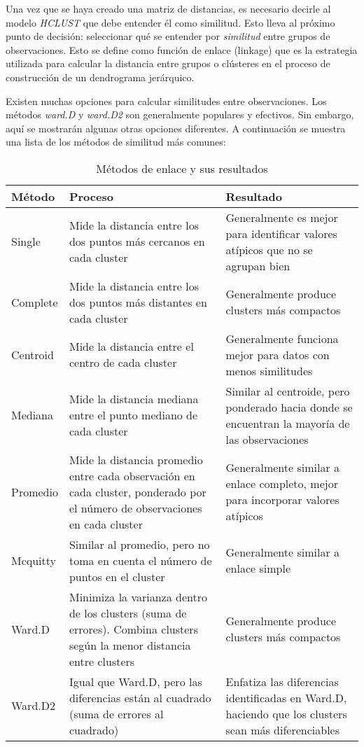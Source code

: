 {\color{red}Una vez que se haya creado una matriz de distancias, es necesario decirle al modelo \textit{HCLUST} que debe entender él como similitud. Esto lleva al próximo punto de decisión: seleccionar qué se entender por \textit{similitud} entre grupos de observaciones. Esto se define como función de enlace (linkage) que es la estrategia utilizada para calcular la distancia entre grupos o clústeres en el proceso de construcción de un dendrograma jerárquico.

Existen muchas opciones para calcular similitudes entre observaciones. Los métodos \textit{ward.D} y \textit{ward.D2} son generalmente populares y efectivos. Sin embargo, aquí se mostrarán algunas otras opciones diferentes. A continuación se muestra una lista de los métodos de similitud más comunes:

\begin{table}[H]
    \centering
    \begin{tabular}{|p{3.5cm}|p{6cm}|p{6cm}|}
    \hline
    \textbf{Método} & \textbf{Proceso} & \textbf{Resultado} \\
    \hline
    Single & Mide la distancia entre los dos puntos más cercanos en cada cluster & Generalmente es mejor para identificar valores atípicos que no se agrupan bien \\
    \hline
    Complete & Mide la distancia entre los dos puntos más distantes en cada cluster & Generalmente produce clusters más compactos \\
    \hline
    Centroid & Mide la distancia entre el centro de cada cluster & Generalmente funciona mejor para datos con menos similitudes \\
    \hline
    Mediana & Mide la distancia mediana entre el punto mediano de cada cluster & Similar al centroide, pero ponderado hacia donde se encuentran la mayoría de las observaciones \\
    \hline
    Promedio & Mide la distancia promedio entre cada observación en cada cluster, ponderado por el número de observaciones en cada cluster & Generalmente similar a enlace completo, mejor para incorporar valores atípicos \\
    \hline
    Mcquitty & Similar al promedio, pero no toma en cuenta el número de puntos en el cluster & Generalmente similar a enlace simple \\
    \hline
    Ward.D & Minimiza la varianza dentro de los clusters (suma de errores). Combina clusters según la menor distancia entre clusters & Generalmente produce clusters más compactos \\
    \hline
    Ward.D2 & Igual que Ward.D, pero las diferencias están al cuadrado (suma de errores al cuadrado) & Enfatiza las diferencias identificadas en Ward.D, haciendo que los clusters sean más diferenciables \\
    \hline
    \end{tabular}
    \caption{Métodos de enlace y sus resultados}
\end{table}

}
